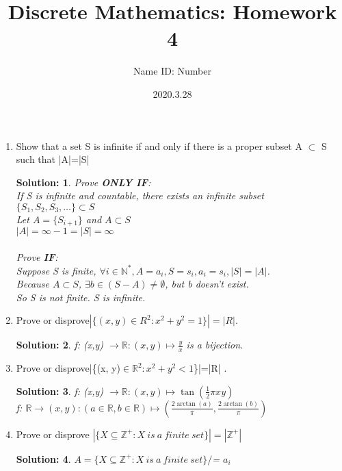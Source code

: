 \documentclass{article}
\title{Discrete Mathematics:  Homework 4}
\author{Name  \quad  \quad ID: Number}
\date{2020.3.28}
\theoremstyle{break}
\newtheorem*{solution*}{\textbf{Solution:} }
\begin{document}
\maketitle
\begin{enumerate}
        \item Show that a set S is infinite if and only if there is a proper subset A $\subset$ S such that |A|=|S|
        \begin{solution*}
            Prove \textbf{ONLY IF}:\\
            If S is infinite and countable, there exists an infinite subset $ \{  S_1, S_2, S_3, \dots \}  \subset S$ \\
            Let $A = \{ S_{i+1} \}$ and $A \subset S$\\
            $|A| = \infty -1 = |S| = \infty$\\ \\
            Prove \textbf{IF}:\\
            Suppose S is finite, $\forall i \in \mathbb{N}^*, A = {a_i}, S={s_i}, a_i = s_i, |S| = |A|$.\\
            Because $A \subset S$, $\exists b \in (S-A) \neq \emptyset$, but b doesn't exist.\\
            So S is not finite. S is infinite.\\
        \end{solution*}
        \item  Prove or disprove$ | \{(x, y)\in R^2 : x^2 + y^2= 1\}|=|R| $.
        \begin{solution*}
            f: (x,y) $\to \mathbb{R} :  (x,y) \mapsto \frac{y}{x} $ is a bijection. \\
        \end{solution*}
        \item Prove or disprove|\{(x, y)$\in \mathbb{R}^2 : x^2+y^2 < 1$\}|=|R| .
        \begin{solution*}
            f: (x,y) $\to \mathbb{R}: (x,y) \mapsto \tan(\frac{1}{2} \pi xy) $\\
            f: $\mathbb{R} \to (x,y) : (a \in \mathbb{R}, b \in \mathbb{R} ) \mapsto ( \frac{2\arctan(a)}{\pi}, \frac{ 2\arctan(b)}{\pi})$\\
        \end{solution*}
        \newpage
        \item Prove or disprove $| \{  X \subseteq \mathbb{Z}^{+} : X \ is\  a \ finite \ set \}| = | \mathbb{Z} ^{+} |$
        \begin{solution*}
            $A = \{  X \subseteq \mathbb{Z}^{+} : X \ is\  a \ finite \ set \} /$= {$a_i$}

\end{solution*}
\end{enumerate}
\end{document}
